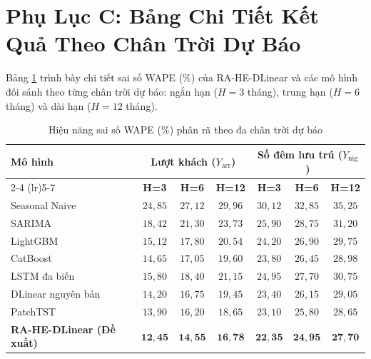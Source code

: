\section*{Phụ Lục C: Bảng Chi Tiết Kết Quả Theo Chân Trời Dự Báo}
\label{sec:appendix_horizon_results}

Bảng \ref{tab:appendix_horizon_results} trình bày chi tiết sai số WAPE (\%) của RA-HE-DLinear và các mô hình đối sánh theo từng chân trời dự báo: ngắn hạn ($H=3$ tháng), trung hạn ($H=6$ tháng) và dài hạn ($H=12$ tháng).

\begin{table}[H]
\centering
\caption{Hiệu năng sai số WAPE (\%) phân rã theo đa chân trời dự báo}
\label{tab:appendix_horizon_results}
\begin{tabular}{lcccccc}
\toprule
\multirow{2}{*}{\textbf{Mô hình}} & \multicolumn{3}{c}{\textbf{Lượt khách ($Y_{\text{arr}}$)}} & \multicolumn{3}{c}{\textbf{Số đêm lưu trú ($Y_{\text{nig}}$)}} \\
\cmidrule(lr){2-4} \cmidrule(lr){5-7}
& \textbf{H=3} & \textbf{H=6} & \textbf{H=12} & \textbf{H=3} & \textbf{H=6} & \textbf{H=12} \\
\midrule
Seasonal Naive & $24{,}85$ & $27{,}12$ & $29{,}96$ & $30{,}12$ & $32{,}85$ & $35{,}25$ \\
SARIMA & $18{,}42$ & $21{,}30$ & $23{,}73$ & $25{,}90$ & $28{,}75$ & $31{,}20$ \\
LightGBM & $15{,}12$ & $17{,}80$ & $20{,}54$ & $24{,}20$ & $26{,}90$ & $29{,}75$ \\
CatBoost & $14{,}65$ & $17{,}05$ & $19{,}60$ & $23{,}80$ & $26{,}45$ & $28{,}98$ \\
LSTM đa biến & $15{,}80$ & $18{,}40$ & $21{,}15$ & $24{,}95$ & $27{,}70$ & $30{,}75$ \\
DLinear nguyên bản & $14{,}20$ & $16{,}75$ & $19{,}45$ & $23{,}40$ & $26{,}15$ & $29{,}05$ \\
PatchTST & $13{,}90$ & $16{,}20$ & $18{,}65$ & $23{,}10$ & $25{,}80$ & $28{,}65$ \\
\midrule
\textbf{RA-HE-DLinear (Đề xuất)} & $\mathbf{12{,}45}$ & $\mathbf{14{,}55}$ & $\mathbf{16{,}78}$ & $\mathbf{22{,}35}$ & $\mathbf{24{,}95}$ & $\mathbf{27{,}70}$ \\
\bottomrule
\end{tabular}
\end{table}
